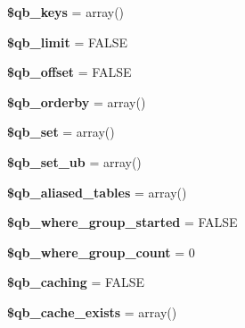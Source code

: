 \begin{DoxyCompactItemize}
{\bfseries \$qb\+\_\+keys} = array()
\item 
\mbox{\label{class_c_i___d_b__query__builder_a383e4f5a10c762a271105c85b3ebca61}} 
{\bfseries \$qb\+\_\+limit} = F\+A\+L\+SE
\item 
\mbox{\label{class_c_i___d_b__query__builder_aa45418e873986d0f6e6bc768ea5567e5}} 
{\bfseries \$qb\+\_\+offset} = F\+A\+L\+SE
\item 
\mbox{\label{class_c_i___d_b__query__builder_a8e856c95a5ca3df7c7deba3782182a3e}} 
{\bfseries \$qb\+\_\+orderby} = array()
\item 
\mbox{\label{class_c_i___d_b__query__builder_a377913806717a7b6bcd35ed1df5ac072}} 
{\bfseries \$qb\+\_\+set} = array()
\item 
\mbox{\label{class_c_i___d_b__query__builder_af816caafbd6c91c12d1cf7b39ad9de35}} 
{\bfseries \$qb\+\_\+set\+\_\+ub} = array()
\item 
\mbox{\label{class_c_i___d_b__query__builder_a1a27aa0ceada8a74b23613bf3cd04e65}} 
{\bfseries \$qb\+\_\+aliased\+\_\+tables} = array()
\item 
\mbox{\label{class_c_i___d_b__query__builder_aaae9d24ab424373f1bdbc1b601074433}} 
{\bfseries \$qb\+\_\+where\+\_\+group\+\_\+started} = F\+A\+L\+SE
\item 
\mbox{\label{class_c_i___d_b__query__builder_a2fcbcc620115436314a2d25e7c9ce366}} 
{\bfseries \$qb\+\_\+where\+\_\+group\+\_\+count} = 0
\item 
\mbox{\label{class_c_i___d_b__query__builder_aa1fb22248b06dc9b0b803ba19e54bcbd}} 
{\bfseries \$qb\+\_\+caching} = F\+A\+L\+SE
\item 
\mbox{\label{class_c_i___d_b__query__builder_a895766ccda772ba2c14b755e5eed3615}} 
{\bfseries \$qb\+\_\+cache\+\_\+exists} = array()
\item 

\end{DoxyCompactItemize}
